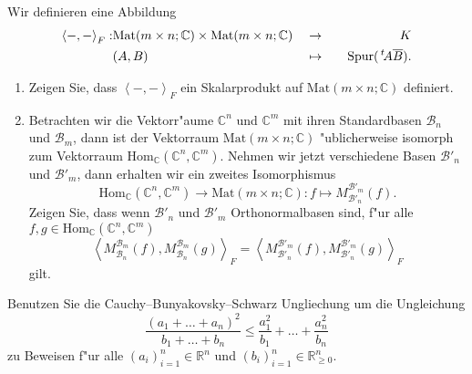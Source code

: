 \documentclass[a4,11pt]{article}
\begin{document}
\vspace*{-17mm}
{
\kopf
}


\begin{aufgabe}[4 Punkte]


\end{aufgabe}

\begin{aufgabe}[4 Punkte]
Wir definieren eine Abbildung 
\begin{align*}
\left<-,-\right>_{F} : &\text{Mat}(m \times n; \mathbb{C}) \times\text{Mat}(m \times n; \mathbb{C}) &&\to &&&K\\
&(A,B)&&\mapsto &&&\text{Spur}(\,^t\!A \overline{B}).
\end{align*}
\begin{enumerate}
\item Zeigen Sie, dass $\left<-,-\right>_{F}$ ein Skalarprodukt auf $\text{Mat}(m \times n; \mathbb{C})$ definiert.
\item Betrachten wir die Vektorr"aume $\mathbb{C}^n$ und $\mathbb{C}^m$ mit ihren Standardbasen $\mathcal{B}_n$ und $\mathcal{B}_m$, dann ist der Vektorraum $\text{Mat}(m \times n; \mathbb{C})$ "ublicherweise isomorph zum Vektorraum $\text{Hom}_\mathbb{C}(\mathbb{C}^n, \mathbb{C}^m)$. Nehmen wir jetzt verschiedene Basen $\mathcal{B}'_n$ und $\mathcal{B}'_m$, dann erhalten wir ein zweites Isomorphismus
\[
\text{Hom}_\mathbb{C}(\mathbb{C}^n, \mathbb{C}^m) \to \text{Mat}(m \times n; \mathbb{C}) : f \mapsto M_{\mathcal{B}'_n}^{\mathcal{B}'_m}(f).
\]
Zeigen Sie, dass wenn $\mathcal{B}'_n$ und $\mathcal{B}'_m$ Orthonormalbasen sind, f"ur alle $f, g \in \text{Hom}_\mathbb{C}(\mathbb{C}^n, \mathbb{C}^m)$
\[
\left<M_{\mathcal{B}_n}^{\mathcal{B}_m}(f),M_{\mathcal{B}_n}^{\mathcal{B}_m}(g)\right>_{F} = \left<M_{\mathcal{B}'_n}^{\mathcal{B}'_m}(f),M_{\mathcal{B}'_n}^{\mathcal{B}'_m}(g)\right>_{F}
\]
gilt.
\begin{center}

\end{center}
\end{enumerate}
\end{aufgabe}

\begin{aufgabe}[4 Punkte]
Benutzen Sie die Cauchy–Bunyakovsky–Schwarz Ungliechung um die Ungleichung
\[
\frac{(a_1 + \dots +  a_n)^2}{b_1 + \dots + b_n} \leq \frac{a_1^2}{b_1} + \dots + \frac{a_n^2}{b_n}
\]
zu Beweisen f"ur alle $(a_i)_{i = 1}^n \in \mathbb{R}^n$ und $(b_i)_{i=1}^n \in \mathbb{R}^n_{\geq 0}$.
\end{aufgabe}
\end{document}
